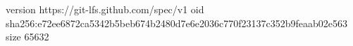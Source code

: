 version https://git-lfs.github.com/spec/v1
oid sha256:e72ee6872ca5342b5beb674b2480d7e6e2036c770f23137c352b9feaab02e563
size 65632
